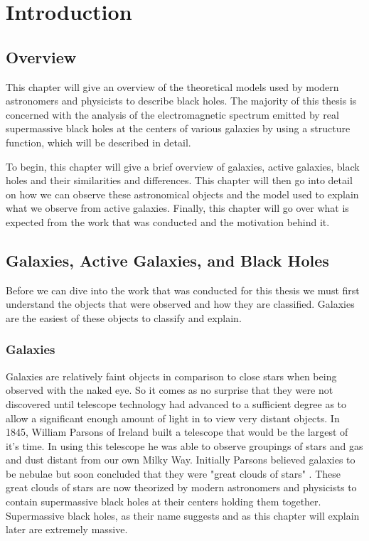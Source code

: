 \documentclass[12pt, oneside]{smuthesis}
\begin{document}
\chapter{\sc Introduction}

\section{\sc Overview}

This chapter will give an overview of the theoretical models used by modern astronomers and physicists to describe black holes. The majority of this thesis is concerned with the analysis of the electromagnetic spectrum emitted by real supermassive black holes at the centers of various galaxies by using a structure function, which will be described in detail.

To begin, this chapter will give a brief overview of galaxies, active galaxies, black holes and their similarities and differences. This chapter will then go into detail on how we can observe these astronomical objects and the model used to explain what we observe from active galaxies. Finally, this chapter will go over what is expected from the work that was conducted and the motivation behind it.
\newpage

\section{\sc Galaxies, Active Galaxies, and Black Holes}

Before we can dive into the work that was conducted for this thesis we must first understand the objects that were observed and how they are classified. Galaxies are the easiest of these objects to classify and explain.

\subsection{\sc Galaxies}

Galaxies are relatively faint objects in comparison to close stars when being observed with the naked eye. So it comes as no surprise that they were not discovered until telescope technology had advanced to a sufficient degree as to allow a significant enough amount of light in to view very distant objects. In 1845, William Parsons of Ireland built a telescope that would be the largest of it's time. In using this telescope he was able to observe groupings of stars and gas and dust distant from our own Milky Way. Initially Parsons believed galaxies to be nebulae but soon concluded that they were "great clouds of stars" \cite{sag}. These great clouds of stars are now theorized by modern astronomers and physicists to contain supermassive black holes at their centers holding them together. Supermassive black holes, as their name suggests and as this chapter will explain later are extremely massive.
\end{document}
